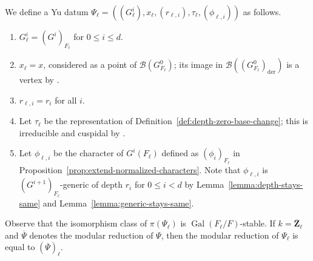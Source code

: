 \documentclass[reqno]{amsart}
\numberwithin{equation}{subsection}
\newcommand{\F}{\mathbf{F}}
\newcommand{\Z}{\mathbf{Z}}
\newcommand{\Gal}{\operatorname{Gal}}
\newcommand{\ol}[1]{\overline{#1}}
\newcommand\cB{\mathcal{B}}
\DeclareMathOperator{\Nm}{Nm}
\DeclareMathOperator{\der}{der}
\theoremstyle{remark}
\numberwithin{equation}{subsection}
\numberwithin{figure}{subsection}
\begin{document}



We define a Yu datum $\Psi_\ell = ((G_\ell^i), x_\ell, (r_{\ell,i}), \tau_\ell, (\phi_{\ell,i}))$ as follows.
\begin{enumerate}
\item $G_\ell^i = (G^i)_{F_\ell}$ for $0 \leq i \leq d$.
\item $x_\ell = x$, considered as a point of $\cB(G^0_{F_\ell})$; its image in $\cB((G^0_{F_\ell})_{\der})$ is a vertex by \cite[Proposition~4.1.2(3)]{Cot26b}.
\item $r_{\ell,i} = r_i$ for all $i$.
\item Let $\tau_\ell$ be the representation of Definition~\ref{def:depth-zero-base-change}; this is irreducible and cuspidal by \cite[Lemma~3.5.9 and Proposition~4.2.2]{Cot26b}.
\item Let $\phi_{\ell,i}$ be the character of $G^i(F_\ell)$ defined as $(\phi_i)_{F_\ell}$ in Proposition~\ref{prop:extend-normalized-characters}. Note that $\phi_{\ell,i}$ is $(G^{i+1})_{F_\ell}$-generic of depth $r_i$ for $0\leq i<d$ by Lemma~\ref{lemma:depth-stays-same} and Lemma~\ref{lemma:generic-stays-same}.
\end{enumerate}
Observe that the isomorphism class of $\pi(\Psi_\ell)$ is $\Gal(F_\ell/F)$-stable. If $k = \ol\Z_\ell$ and $\ol\Psi$ denotes the modular reduction of $\Psi$, then the modular reduction of $\Psi_\ell$ is equal to $(\ol\Psi)_\ell$.
\end{document}

